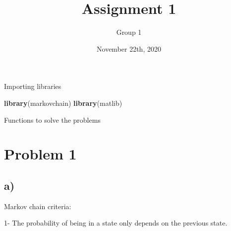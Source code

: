 \documentclass[]{article}
\title{Assignment 1}
\author{Group 1}
\date{November 22th, 2020}
\newenvironment{Shaded}{\begin{snugshade}}{\end{snugshade}}
\newcommand{\ControlFlowTok}[1]{\textcolor[rgb]{0.13,0.29,0.53}{\textbf{#1}}}
\newcommand{\DecValTok}[1]{\textcolor[rgb]{0.00,0.00,0.81}{#1}}
\newcommand{\KeywordTok}[1]{\textcolor[rgb]{0.13,0.29,0.53}{\textbf{#1}}}
\newcommand{\NormalTok}[1]{#1}
\newcommand{\OperatorTok}[1]{\textcolor[rgb]{0.81,0.36,0.00}{\textbf{#1}}}
\newcommand{\StringTok}[1]{\textcolor[rgb]{0.31,0.60,0.02}{#1}}
\begin{document}
\maketitle

Importing libraries

\begin{Shaded}
\begin{Highlighting}[]
\KeywordTok{library}\NormalTok{(markovchain)}
\KeywordTok{library}\NormalTok{(matlib)}
\end{Highlighting}
\end{Shaded}

Functions to solve the problems

\begin{Shaded}
\end{Shaded}

\hypertarget{problem-1}{%
\section{Problem 1}\label{problem-1}}

\hypertarget{a}{%
\subsection{a)}\label{a}}

Markov chain criteria:

1- The probability of being in a state only depends on the previous
state.
\end{document}
